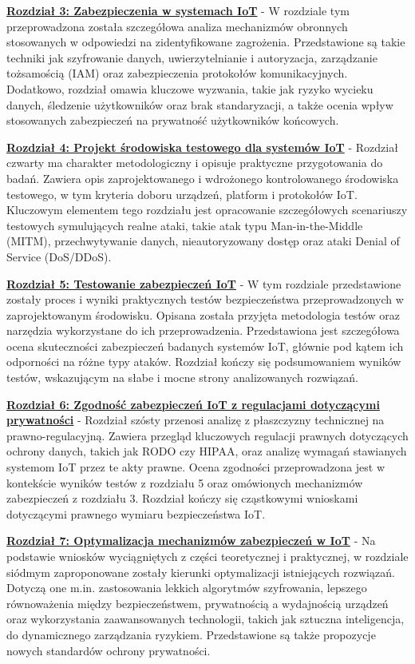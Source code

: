 \textbf{\hyperref[chap:rozdzial3] {Rozdział 3: Zabezpieczenia w systemach IoT}} - W rozdziale tym przeprowadzona została szczegółowa analiza mechanizmów obronnych stosowanych w odpowiedzi na zidentyfikowane zagrożenia. Przedstawione są takie techniki jak szyfrowanie danych, uwierzytelnianie i autoryzacja, zarządzanie tożsamością (IAM) oraz zabezpieczenia protokołów komunikacyjnych. Dodatkowo, rozdział omawia kluczowe wyzwania, takie jak ryzyko wycieku danych, śledzenie użytkowników oraz brak standaryzacji, a także ocenia wpływ stosowanych zabezpieczeń na prywatność użytkowników końcowych.

\textbf{\hyperref[chap:rozdzial4] {Rozdział 4: Projekt środowiska testowego dla systemów IoT}} - Rozdział czwarty ma charakter metodologiczny i opisuje praktyczne przygotowania do badań. Zawiera opis zaprojektowanego i wdrożonego kontrolowanego środowiska testowego, w tym kryteria doboru urządzeń, platform i protokołów IoT. Kluczowym elementem tego rozdziału jest opracowanie szczegółowych scenariuszy testowych symulujących realne ataki, takie atak typu Man-in-the-Middle (MITM), przechwytywanie danych, nieautoryzowany dostęp oraz ataki Denial of Service (DoS/DDoS).

\textbf{\hyperref[chap:rozdzial5] {Rozdział 5: Testowanie zabezpieczeń IoT}} - W tym rozdziale przedstawione zostały proces i wyniki praktycznych testów bezpieczeństwa przeprowadzonych w zaprojektowanym środowisku. Opisana została przyjęta metodologia testów oraz narzędzia wykorzystane do ich przeprowadzenia. Przedstawiona jest szczegółowa ocena skuteczności zabezpieczeń badanych systemów IoT, głównie pod kątem ich odporności na różne typy ataków. Rozdział kończy się podsumowaniem wyników testów, wskazującym na słabe i mocne strony analizowanych rozwiązań.

\textbf{\hyperref[chap:rozdzial6] {Rozdział 6: Zgodność zabezpieczeń IoT z regulacjami dotyczącymi prywatności}} - Rozdział szósty przenosi analizę z płaszczyzny technicznej na prawno-regulacyjną. Zawiera przegląd kluczowych regulacji prawnych dotyczących ochrony danych, takich jak RODO czy HIPAA, oraz analizę wymagań stawianych systemom IoT przez te akty prawne. Ocena zgodności przeprowadzona jest w kontekście wyników testów z rozdziału 5 oraz omówionych mechanizmów zabezpieczeń z rozdziału 3. Rozdział kończy się cząstkowymi wnioskami dotyczącymi prawnego wymiaru bezpieczeństwa IoT.

\textbf{\hyperref[chap:rozdzial7] {Rozdział 7: Optymalizacja mechanizmów zabezpieczeń w IoT}} - Na podstawie wniosków wyciągniętych z części teoretycznej i praktycznej, w rozdziale siódmym zaproponowane zostały kierunki optymalizacji istniejących rozwiązań. Dotyczą one m.in. zastosowania lekkich algorytmów szyfrowania, lepszego równoważenia między bezpieczeństwem, prywatnością a wydajnością urządzeń oraz wykorzystania zaawansowanych technologii, takich jak sztuczna inteligencja, do dynamicznego zarządzania ryzykiem. Przedstawione są także propozycje nowych standardów ochrony prywatności.

